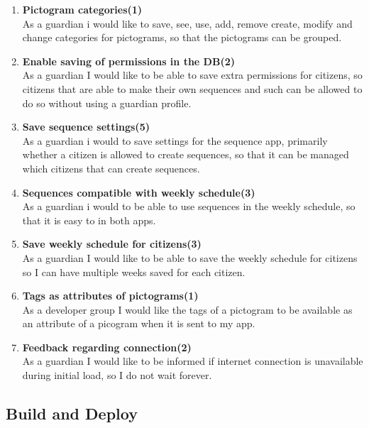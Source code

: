 \begin{enumerate}
	\item \textbf{Pictogram categories(1)}\\
	As a guardian i would like to save, see, use, add, remove create, modify and change categories for pictograms, so that the pictograms can be grouped. 
	
	\item \textbf{Enable saving of permissions in the DB(2)}\\
	As a guardian I would like to be able to save extra permissions for citizens, so citizens that are able to make their own sequences and such can be allowed to do so without using a guardian profile.
	
	\item \textbf{Save sequence settings(5)}\\
	As a guardian i would to save settings for the sequence app, primarily whether a citizen is allowed to create sequences, so that it can be managed which citizens that can create sequences. 
	
	\item \textbf{Sequences compatible with weekly schedule(3)}\\
	As a guardian i would to be able to use sequences in the weekly schedule, so that it is easy to in both apps.
	
	\item \textbf{Save weekly schedule for citizens(3)}\\
	As a guardian I would like to be able to save the weekly schedule for citizens so I can have multiple weeks saved for each citizen.
	
	\item \textbf{Tags as attributes of pictograms(1)}\\
	As a developer group I would like the tags of a pictogram to be available as an attribute of a picogram when it is sent to my app. 
	
	\item \textbf{Feedback regarding connection(2)}\\
	As a guardian I would like to be informed if internet connection is unavailable during initial load, so I do not wait forever.
\end{enumerate}

\subsection{Build and Deploy}

